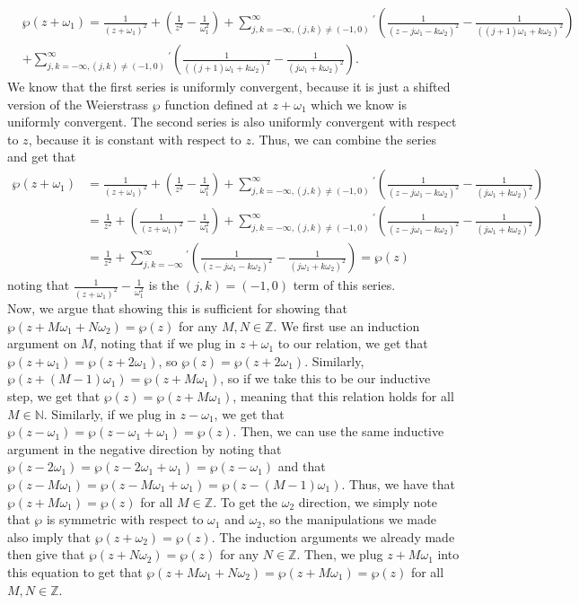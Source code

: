\documentclass{article}
\begin{document}
\begin{align*}
&\wp(z+\omega_1)=\frac{1}{(z+\omega_1)^2}+\left(\frac{1}{z^2}-\frac{1}{\omega_1^2}\right)+\sum_{j,k=-\infty, (j,k)\neq(-1,0)}^{\infty}{}^{'}\left( \frac{1}{(z-j\omega_1-k \omega_2)^2}-\frac{1}{((j+1) \omega_1+k \omega_2)^2}\right)\\&+\sum_{j,k=-\infty, (j,k)\neq(-1,0)}^{\infty}{}^{'}\left( \frac{1}{((j+1) \omega_1+k \omega_2)^2}-\frac{1}{(j\omega_1+k\omega_2)^2}\right).
\end{align*}
We know that the first series is uniformly convergent, because it is just a shifted version of the Weierstrass $\wp$ function defined at $z+\omega_1$ which we know is uniformly convergent. The second series is also uniformly convergent with respect to $z$, because it is constant with respect to $z$. Thus, we can combine the series and get that 
\begin{align*}
\wp(z+\omega_1)&=\frac{1}{(z+\omega_1)^2}+\left(\frac{1}{z^2}-\frac{1}{\omega_1^2}\right)+\sum_{j,k=-\infty, (j,k)\neq(-1,0)}^{\infty}{}^{'}\left( \frac{1}{(z-j\omega_1-k \omega_2)^2}-\frac{1}{(j\omega_1+k \omega_2)^2}\right)\\&=
\frac{1}{z^2}+\left(\frac{1}{(z+\omega_1)^2}-\frac{1}{\omega_1^2}\right)+\sum_{j,k=-\infty, (j,k)\neq(-1,0)}^{\infty}{}^{'}\left( \frac{1}{(z-j\omega_1-k \omega_2)^2}-\frac{1}{(j\omega_1+k \omega_2)^2}\right)\\&=
\frac{1}{z^2}+\sum_{j,k=-\infty}^{\infty}{}^{'}\left( \frac{1}{(z-j\omega_1-k \omega_2)^2}-\frac{1}{(j\omega_1+k \omega_2)^2}\right)=\wp(z)
\end{align*}
noting that $\frac{1}{(z+\omega_1)^2}-\frac{1}{\omega_1^2}$ is the $(j,k)=(-1,0)$ term of this series.\\
Now, we argue that showing this is sufficient for showing that $\wp(z+M\omega_1+N\omega_2)=\wp(z)$ for any $M,N\in\mathbb{Z}$. We first use an induction argument on $M$, noting that if we plug in $z+\omega_1$ to our relation, we get that $\wp(z+\omega_1)=\wp(z+2\omega_1)$, so $\wp(z)=\wp(z+2\omega_1)$. Similarly,  $\wp(z+(M-1)\omega_1)=\wp(z+M\omega_1)$, so if we take this to be our inductive step, we get that $\wp(z)=\wp(z+M\omega_1)$, meaning that this relation holds for all $M\in\mathbb{N}$. Similarly, if we plug in $z-\omega_1$, we get that $\wp(z-\omega_1)=\wp(z-\omega_1+\omega_1)=\wp(z)$. Then, we can use the same inductive argument in the negative direction by noting that $\wp(z-2\omega_1)=\wp(z-2\omega_1+\omega_1)=\wp(z-\omega_1)$ and that $\wp(z-M\omega_1)=\wp(z-M\omega_1+\omega_1)=\wp(z-(M-1)\omega_1)$. Thus, we have that $\wp(z+M\omega_1)=\wp(z)$ for all $M\in\mathbb{Z}$. To get the $\omega_2$ direction, we simply note that $\wp$ is symmetric with respect to $\omega_1$ and $\omega_2$, so the manipulations we made also imply that $\wp(z+\omega_2)=\wp(z)$. The induction arguments we already made then give that $\wp(z+N\omega_2)=\wp(z)$ for any $N\in\mathbb{Z}$. Then, we plug $z+M\omega_1$ into this equation to get that $\wp(z+M\omega_1+N\omega_2)=\wp(z+M\omega_1)=\wp(z)$ for all $M,N\in\mathbb{Z}$.
\end{document}
